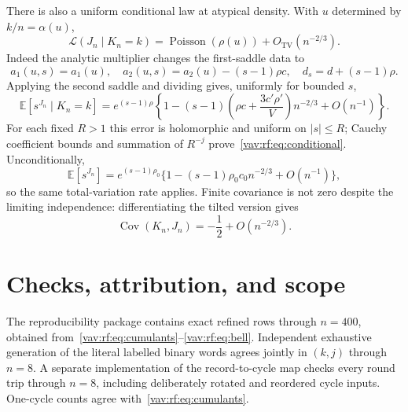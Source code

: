 \documentclass[11pt]{article}
\theoremstyle{remark}\newtheorem{remark}[theorem]{Remark}
\newcommand{\E}{\mathbb E}
\newcommand{\Cov}{\operatorname{Cov}}
\newcommand{\Pois}{\operatorname{Poisson}}
\newcommand{\TV}{\operatorname{TV}}
\begin{document}
There is also a uniform conditional law at atypical density. With $u$ determined by $k/n=\alpha(u)$,
\begin{equation}\label{vav:rf:eq:conditional}
 \mathcal L(J_n\mid K_n=k)=\Pois(\rho(u))+O_{\TV}(n^{-2/3}).
\end{equation}
Indeed the analytic multiplier changes the first-saddle data to
\[
 a_1(u,s)=a_1(u),\quad a_2(u,s)=a_2(u)-(s-1)\rho c,
 \quad d_s=d+(s-1)\rho.
\]
Applying the second saddle and dividing gives, uniformly for bounded $s$,
\begin{equation}\label{vav:rf:eq:conditionalcorrection}
 \E[s^{J_n}\mid K_n=k]=e^{(s-1)\rho}
 \left\{1-(s-1)\left(\rho c+\frac{3c'\rho'}{V}\right)n^{-2/3}
                  +O(n^{-1})\right\}.
\end{equation}
For each fixed $R>1$ this error is holomorphic and uniform on $|s|\le R$; Cauchy coefficient bounds and summation of $R^{-j}$ prove~\eqref{vav:rf:eq:conditional}. Unconditionally,
\begin{equation}\label{vav:rf:eq:unconditional}
 \E[s^{J_n}]=e^{(s-1)\rho_0}
 \{1-(s-1)\rho_0c_0n^{-2/3}+O(n^{-1})\},
\end{equation}
so the same total-variation rate applies. Finite covariance is not zero despite the limiting independence: differentiating the tilted version gives
\[
 \Cov(K_n,J_n)=-\frac12+O(n^{-2/3}).
\]

\section{Checks, attribution, and scope}\label{vav:rf:sec:checks}
The reproducibility package contains exact refined rows through $n=400$, obtained from~\eqref{vav:rf:eq:cumulants}--\eqref{vav:rf:eq:bell}. Independent exhaustive generation of the literal labelled binary words agrees jointly in $(k,j)$ through $n=8$. A separate implementation of the record-to-cycle map checks every round trip through $n=8$, including deliberately rotated and reordered cycle inputs. One-cycle counts agree with~\eqref{vav:rf:eq:cumulants}.
\end{document}

